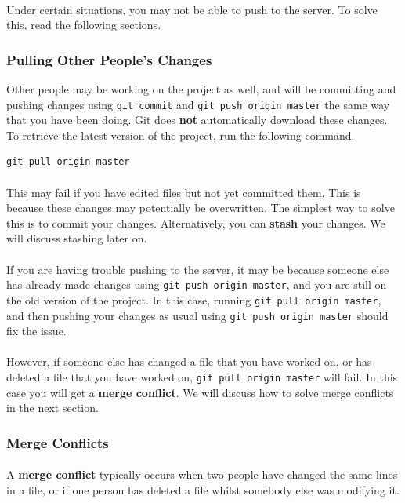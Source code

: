\documentclass[11pt]{article}
\begin{document}
\paragraph{}
Under certain situations, you may not be able to push to the server. To solve this, read the following sections.
\subsubsection{Pulling Other People's Changes}
Other people may be working on the project as well, and will be committing and pushing changes using \lstinline{git commit} and \lstinline{git push origin master} the same way that you have been doing. Git does \textbf{not} automatically download these changes. To retrieve the latest version of the project, run the following command.
\begin{lstlisting}
git pull origin master
\end{lstlisting}
\paragraph{}
This may fail if you have edited files but not yet committed them. This is because these changes may potentially be overwritten. The simplest way to solve this is to commit your changes. Alternatively, you can \textbf{stash} your changes. We will discuss stashing later on.
\paragraph{}
If you are having trouble pushing to the server, it may be because someone else has already made changes using \lstinline{git push origin master}, and you are still on the old version of the project. In this case, running \lstinline{git pull origin master}, and then pushing your changes as usual using \lstinline{git push origin master} should fix the issue.
\paragraph{}
However, if someone else has changed a file that you have worked on, or has deleted a file that you have worked on, \lstinline{git pull origin master} will fail. In this case you will get a \textbf{merge conflict}. We will discuss how to solve merge conflicts in the next section.
\subsubsection{Merge Conflicts}
\paragraph{}
A \textbf{merge conflict} typically occurs when two people have changed the same lines in a file, or if one person has deleted a file whilst somebody else was modifying it.
\end{document}
